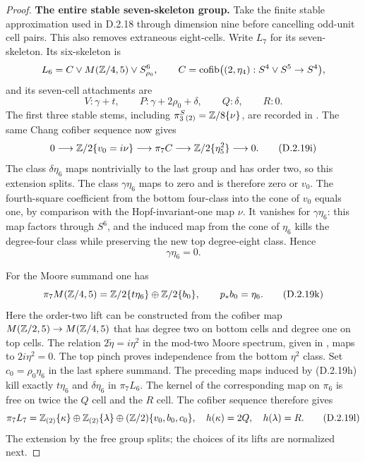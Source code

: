 \begin{proof}
\medskip\noindent
\textbf{The entire stable seven-skeleton group.}
Take the finite stable approximation used in D.2.18 through
dimension nine before cancelling odd-unit cell pairs. This
also removes extraneous eight-cells. Write $L_7$ for its
seven-skeleton. Its six-skeleton is
\[
 L_6=C\vee M(\mathbb Z/4,5)\vee S^6_{\rho_0},
 \qquad C=\operatorname{cofib}\bigl((2,\eta_4):S^4\vee S^5\to S^4\bigr),
\]
and its seven-cell attachments are
\[
 V:\gamma+t,\qquad
 P:\gamma+2\rho_0+\delta,\qquad Q:\delta,\qquad R:0.
 \tag{D.2.19h}
\]
The first three stable stems, including
$\pi_3^S{}_{(2)}=\mathbb Z/8\{\nu\}$, are recorded in
\cite[\S2, (2.1), p.~149]{I_Oka1986}.
The same Chang cofiber sequence now gives
\[
 0\longrightarrow\mathbb Z/2\{v_0=i\nu\}
 \longrightarrow\pi_7C
 \longrightarrow\mathbb Z/2\{\eta_5^2\}\longrightarrow0.
 \tag{D.2.19i}
\]
The class $\delta\eta_6$ maps nontrivially to the last
group and has order two, so this extension splits.
The class $\gamma\eta_6$ maps to zero and is therefore
zero or $v_0$. The fourth-square coefficient from the
bottom four-class into the cone of $v_0$ equals one,
by comparison with the Hopf-invariant-one map $\nu$.
It vanishes for $\gamma\eta_6$: this map factors through
$S^6$, and the induced map from the cone of $\eta_6$
kills the degree-four class while preserving the new
top degree-eight class. Hence
\[
 \gamma\eta_6=0.
 \tag{D.2.19j}
\]

For the Moore summand one has
\[
 \pi_7M(\mathbb Z/4,5)
 =\mathbb Z/2\{t\eta_6\}\oplus\mathbb Z/2\{b_0\},
 \qquad p_*b_0=\eta_6.
 \tag{D.2.19k}
\]
Here the order-two lift can be constructed from the
cofiber map $M(\mathbb Z/2,5)\to M(\mathbb Z/4,5)$ that has
degree two on bottom cells and degree one on top cells.
The relation $2\widetilde\eta=i\eta^2$ in the mod-two
Moore spectrum, given in
\cite[\S2, (2.2)(a)--(b), p.~149]{I_Oka1986}, maps to
$2i\eta^2=0$. The top pinch proves independence from
the bottom $\eta^2$ class.
Set $c_0=\rho_0\eta_6$ in the last sphere summand.
The preceding maps induced by \textup{(D.2.19h)} kill
exactly $t\eta_6$ and $\delta\eta_6$ in $\pi_7L_6$.
The kernel of the corresponding map on $\pi_6$ is free
on twice the $Q$ cell and the $R$ cell. The cofiber
sequence therefore gives
\[
 \pi_7L_7=
 \mathbb Z_{(2)}\{\kappa\}\oplus\mathbb Z_{(2)}\{\lambda\}
 \oplus(\mathbb Z/2)\{v_0,b_0,c_0\},
 \quad h(\kappa)=2Q,\quad h(\lambda)=R.
 \tag{D.2.19l}
\]
The extension by the free group splits; the choices of
its lifts are normalized next.


\end{proof}
